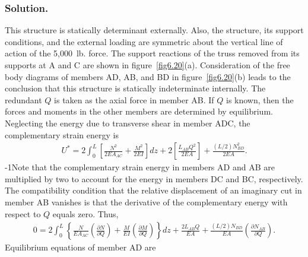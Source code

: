 \documentclass{AeroStructure-ERJohnson}
\begin{document}
\begin{example*}
\subsubsection{Solution.} This structure is statically determinant externally.
 Also, the structure, its support conditions, and the external loading are symmetric about the vertical line of action of the 5,000~lb. force. The support reactions of the truss removed from its supports at A and C are shown in figure~\ref{fig6.20}(a). Consideration of the free body diagrams of members AD, AB, and BD in figure~\ref{fig6.20}(b) leads to the conclusion that this structure is statically indeterminate internally. The redundant $Q$ is taken as the axial force in member AB. If $Q$ is known, then the forces and moments in the other members are determined by equilibrium. Neglecting the energy due to transverse shear in member ADC, the complementary strain energy is
\setcounter{equation}{0}\def\theequation{\alph{equation}}
\begin{align}
U^{*}=2 \int_0^L\left[\frac{N^{2}}{2 E A_{A C}}+\frac{M^{2}}{2 E I}\right] d z+2\left[\frac{L_{A B} Q^{2}}{2 E A}\right]+\frac{(L / 2) N_{B D}^{2}}{2 E A}.
\end{align}
\looseness-1Note that the complementary strain energy in members AD and AB are multiplied by two to account for the energy in members DC and BC, respectively. The compatibility condition that the relative displacement of an imaginary cut in member AB vanishes is that the derivative of the complementary energy with respect to $Q$ equals zero. Thus,
\begin{align}
0=2 \int_{0}^{L}\left\{\frac{N}{E A_{A C}}\left(\frac{\partial N}{\partial Q}\right)+\frac{M}{E I}\left(\frac{\partial M}{\partial Q}\right)\right\} d z+\frac{2 L_{A B} Q}{E A}+\frac{(L / 2) N_{B D}}{E A}\left(\frac{\partial N_{A B}}{\partial Q}\right).
\end{align}
Equilibrium equations of member AD are
\begin{align}

\end{align}
\end{example*}
\end{document}
